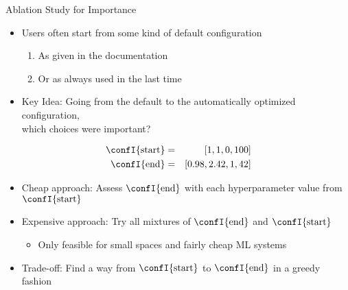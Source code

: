 \begin{frame}[c]{Ablation Study for Importance}

\begin{itemize}
	\item Users often start from some kind of default configuration
	\begin{enumerate}
		\item As given in the documentation 
		\item Or as always used in the last time
	\end{enumerate}
    \pause
	\item \alert{Key Idea}: Going from the default to the automatically optimized configuration,\\
	 which choices were important?
\end{itemize}

\begin{eqnarray}
\confI{\text{start}} &=& [1, 1, 0, 100]  \nonumber\\
\confI{\text{end}} &=& [0.98, 2.42, 1, 42]  \nonumber
\end{eqnarray}

\pause
\begin{itemize}
	\item Cheap approach: Assess $\confI{\text{end}}$ with each hyperparameter value from $\confI{\text{start}}$
	\pause
	\item Expensive approach: Try all mixtures of $\confI{\text{end}}$ and $\confI{\text{start}}$
	\begin{itemize}
		\item  Only feasible for small spaces and fairly cheap ML systems
	\end{itemize}
	\pause
	\item Trade-off: Find a way from $\confI{\text{start}}$ to $\confI{\text{end}}$ in a greedy fashion 
\end{itemize}

\end{frame}
